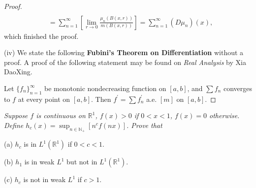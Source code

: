 \begin{proof}
$$\begin{aligned}
\\
&=\sum_{n=1}^{\infty}{\left[ \lim_{r\rightarrow 0} \frac{\mu _n\left( B\left( x,r \right) \right)}{m\left( B\left( x,r \right) \right)} \right]}=\sum_{n=1}^{\infty}{\left( D\mu _n \right) \left( x \right)},
\end{aligned}
$$
which finished the proof.\par
(iv) We state the following \textbf{Fubini's Theorem on Differentiation} without a proof. A proof of the following statement may be found on \textit{Real Analysis} by Xia DaoXing.\par
Let $\{f_n\}_{n=1}^\infty$ be monotonic nondecreasing function on $[a,b]$, and $\sum f_n$ converges to $f$ at every point on $[a,b]$. Then $f^\prime=\sum f_n^\prime$ a.e. $[m]$ on $[a,b]$.
\end{proof}
\begin{problem}\em
Suppose $f$ is continuous on $\mathbb{R}^1$, $f(x)>0$ if $0<x<1$, $f(x)=0$ otherwise. Define $h_c\left( x \right) =\sup_{n\in\mathbb{N}_+}\left[ n^cf\left( nx \right) \right] $. Prove that \par
(a) $h_c$ is in $L^1(\mathbb{R}^1)$ if $0<c<1$.\par
(b) $h_1$ is in weak $L^1$ but not in $L^1(\mathbb{R}^1)$.\par
(c) $h_c$ is not in weak $L^1$ if $c>1$.
\end{problem}
